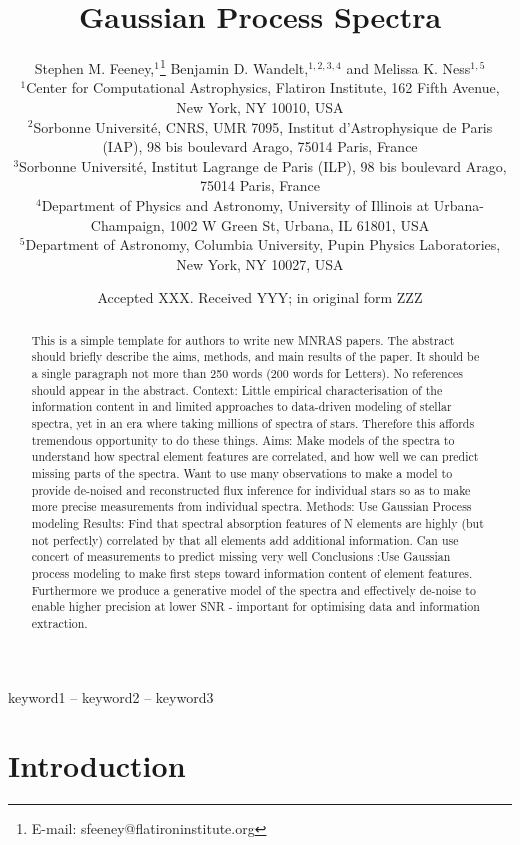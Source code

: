 \documentclass[a4paper,fleqn,usenatbib]{mnras}
\title[Gaussian Process Spectra]{Gaussian Process Spectra}
\author[S. M. Feeney et al.]{
Stephen M. Feeney,$^{1}$\thanks{E-mail: sfeeney@flatironinstitute.org}
Benjamin D. Wandelt,$^{1,2,3,4}$
and Melissa K. Ness$^{1,5}$
\\
$^{1}$Center for Computational Astrophysics, Flatiron Institute, 162 Fifth Avenue, New York, NY 10010, USA\\
$^{2}$Sorbonne Universit\'e, CNRS, UMR 7095,  Institut d'Astrophysique de Paris (IAP), 98 bis boulevard Arago, 75014 Paris, France\\
$^{3}$Sorbonne Universit\'e, Institut Lagrange de Paris (ILP), 98 bis boulevard Arago, 75014 Paris, France\\
$^{4}$Department of Physics and Astronomy, University of Illinois at Urbana-Champaign, 1002 W Green St, Urbana, IL 61801, USA\\
$^{5}$Department of Astronomy, Columbia University, Pupin Physics Laboratories, New York, NY 10027, USA
}
\date{Accepted XXX. Received YYY; in original form ZZZ}
\begin{document}
\label{firstpage}
\pagerange{\pageref{firstpage}--\pageref{lastpage}}
\maketitle

\begin{abstract}
This is a simple template for authors to write new MNRAS papers.
The abstract should briefly describe the aims, methods, and main results of the paper.
It should be a single paragraph not more than 250 words (200 words for Letters).
No references should appear in the abstract.
Context: Little empirical characterisation of the information content in and limited approaches to data-driven modeling of stellar spectra, yet in an era where taking millions of spectra of stars. Therefore this affords tremendous opportunity to do these things.   
Aims: Make models of the spectra to understand how spectral element features are correlated, and how well we can predict missing parts of the spectra. Want to use many observations to make a model to provide de-noised and reconstructed flux inference for individual stars so as to make more precise measurements from individual spectra. 
Methods: Use Gaussian Process modeling
Results: Find that spectral absorption features of N elements are highly (but not perfectly) correlated by that all elements add additional information. Can use concert of measurements to predict missing very well
Conclusions :Use Gaussian process modeling to make first steps toward information content of element features. Furthermore we produce a generative model of the spectra and effectively de-noise to enable higher precision at lower SNR - important for optimising data and information extraction. 
\end{abstract}

\begin{keywords}
keyword1 -- keyword2 -- keyword3
\end{keywords}


\section{Introduction}
\label{sec:intro}
\end{document}
